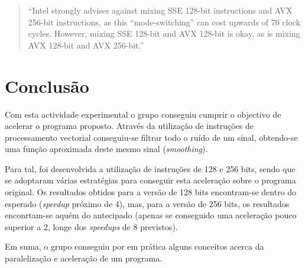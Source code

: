 \documentclass[a4paper]{article}
\begin{document}
	 \begin{quote}
	  ``Intel strongly advises against mixing SSE 128-bit instructions and AVX 256-bit instructions, as this ``mode-switching'' can cost upwards of 70 clock cycles. However, mixing SSE 128-bit and AVX 128-bit is okay, as is mixing AVX 128-bit and AVX 256-bit.''
	 \end{quote}
	   

	
	\section{Conclusão}

	Com esta actividade experimental o grupo conseguiu cumprir o objectivo de acelerar o programa proposto. Através da utilização de instruções de processamento vectorial conseguiu-se filtrar todo o ruído de um sinal, obtendo-se uma função aproximada deste mesmo sinal (\textit{smoothing}).
	
	Para tal, foi desenvolvida a utilização de instruções de 128 e 256 bits, sendo que se adoptaram várias estratégias para conseguir esta aceleração sobre o programa original. Os resultados obtidos para a versão de 128 bits encontram-se dentro do esperado (\textit{speedup} próximo de 4), mas, para a versão de 256 bits, os resultados enconrtam-se aquém do antecipado (apenas se conseguido uma aceleração pouco superior a 2, longe dos \textit{speedups} de 8 previstos).
	
	Em suma, o grupo conseguiu por em prática alguns conceitos acerca da paralelização e aceleração de um programa.
\end{document}
